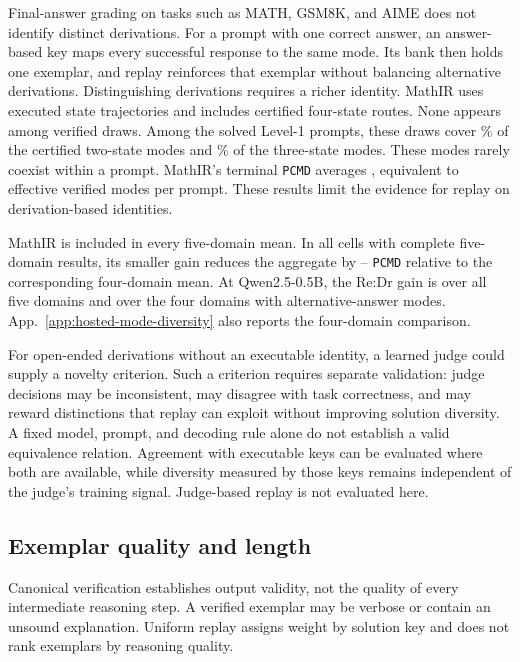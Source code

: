 \documentclass{article}
\newcommand{\1}{\mathbf 1}
\newcommand{\pmd}{\texttt{PCMD}}
\theoremstyle{remark}
\theoremstyle{definition}
\theoremstyle{plain}
\begin{document}
Final-answer grading on tasks such as MATH, GSM8K, and AIME does not identify
distinct derivations. For a prompt with one correct answer, an answer-based
key maps every successful response to the same mode. Its bank then holds
one exemplar, and replay reinforces that exemplar without balancing
alternative derivations. Distinguishing derivations requires a richer
identity. MathIR uses executed state trajectories and includes certified
four-state routes. None appears among \MIRdraws{} verified draws. Among the
\MIRsolvedprompts{} solved Level-1 prompts, these draws cover
\MIRcovershort{}\% of the certified two-state modes and \MIRcovermid{}\%
of the three-state modes. These modes rarely coexist within a prompt.
MathIR's terminal \pmd{} averages \MIRpmdafter{}, equivalent to
\MIRneffafter{} effective verified modes per prompt. These results limit the
evidence for replay on derivation-based identities.

MathIR is included in every five-domain mean. In all \MIRshiftcells{} cells
with complete five-domain results, its smaller gain reduces the aggregate
by \MIRshiftmin{}--\MIRshiftmax{} \pmd{} relative to the corresponding
four-domain mean. At Qwen2.5-0.5B, the Re:Dr gain is \MIRfive{} over all five
domains and \MIRfour{} over the four domains with alternative-answer modes.
App.~\ref{app:hosted-mode-diversity} also reports the four-domain comparison.

For open-ended derivations without an executable identity, a learned judge
could supply a novelty criterion. Such a criterion requires separate
validation: judge decisions may be inconsistent, may disagree with task
correctness, and may reward distinctions that replay can exploit without
improving solution diversity. A fixed model, prompt, and decoding rule alone
do not establish a valid equivalence relation. Agreement with executable
keys can be evaluated where both are available, while diversity measured by
those keys remains independent of the judge's training signal. Judge-based
replay is not evaluated here.

\subsection{Exemplar quality and length}
\label{app:algorithm-quality}

Canonical verification establishes output validity, not the quality of every
intermediate reasoning step. A verified exemplar may be verbose or contain
an unsound explanation. Uniform replay assigns weight by solution key and
does not rank exemplars by reasoning quality.
\end{document}
